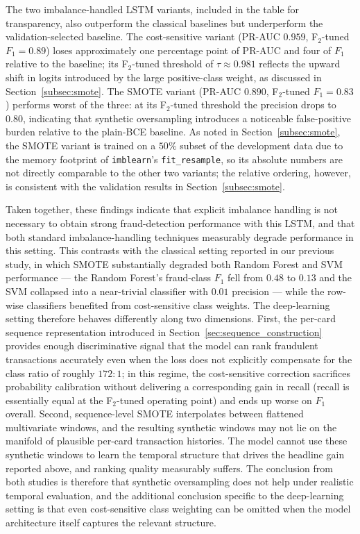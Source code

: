 \documentclass[oneside,12pt,parskip=half,american,numbers=noenddot]{scrreprt}
\begin{document}
The two imbalance-handled LSTM variants, included in the table for transparency, also outperform the classical baselines but underperform the validation-selected baseline. The cost-sensitive variant (PR-AUC $0.959$, F$_2$-tuned $F_1 = 0.89$) loses approximately one percentage point of PR-AUC and four of $F_1$ relative to the baseline; its F$_2$-tuned threshold of $\tau \approx 0.981$ reflects the upward shift in logits introduced by the large positive-class weight, as discussed in Section~\ref{subsec:smote}. The SMOTE variant (PR-AUC $0.890$, F$_2$-tuned $F_1 = 0.83$) performs worst of the three: at its F$_2$-tuned threshold the precision drops to $0.80$, indicating that synthetic oversampling introduces a noticeable false-positive burden relative to the plain-BCE baseline. As noted in Section~\ref{subsec:smote}, the SMOTE variant is trained on a $50\%$ subset of the development data due to the memory footprint of \texttt{imblearn}'s \texttt{fit\_resample}, so its absolute numbers are not directly comparable to the other two variants; the relative ordering, however, is consistent with the validation results in Section~\ref{subsec:smote}.

Taken together, these findings indicate that explicit imbalance handling is not necessary to obtain strong fraud-detection performance with this LSTM, and that both standard imbalance-handling techniques measurably degrade performance in this setting. This contrasts with the classical setting reported in our previous study, in which SMOTE substantially degraded both Random Forest and SVM performance — the Random Forest's fraud-class $F_1$ fell from $0.48$ to $0.13$ and the SVM collapsed into a near-trivial classifier with $0.01$ precision — while the row-wise classifiers benefited from cost-sensitive class weights. The deep-learning setting therefore behaves differently along two dimensions. First, the per-card sequence representation introduced in Section~\ref{sec:sequence_construction} provides enough discriminative signal that the model can rank fraudulent transactions accurately even when the loss does not explicitly compensate for the class ratio of roughly $172{:}1$; in this regime, the cost-sensitive correction sacrifices probability calibration without delivering a corresponding gain in recall (recall is essentially equal at the F$_2$-tuned operating point) and ends up worse on $F_1$ overall. Second, sequence-level SMOTE interpolates between flattened multivariate windows, and the resulting synthetic windows may not lie on the manifold of plausible per-card transaction histories. The model cannot use these synthetic windows to learn the temporal structure that drives the headline gain reported above, and ranking quality measurably suffers. The conclusion from both studies is therefore that synthetic oversampling does not help under realistic temporal evaluation, and the additional conclusion specific to the deep-learning setting is that even cost-sensitive class weighting can be omitted when the model architecture itself captures the relevant structure.
\end{document}
